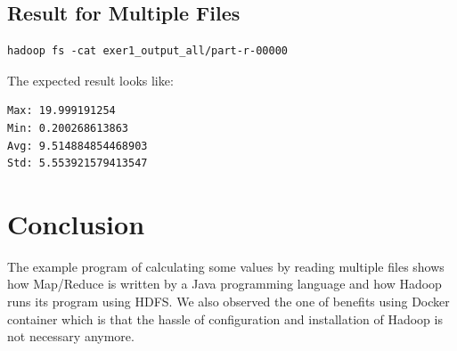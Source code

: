 \subsection{Result for Multiple Files}

\begin{lstlisting}
hadoop fs -cat exer1_output_all/part-r-00000
\end{lstlisting}

The expected result looks like:

\begin{lstlisting}
Max: 19.999191254
Min: 0.200268613863
Avg: 9.514884854468903
Std: 5.553921579413547
\end{lstlisting}

\section{Conclusion}

The example program of calculating some values by reading multiple
files shows how Map/Reduce is written by a Java programming language
and how Hadoop runs its program using HDFS. We also observed the one
of benefits using Docker container which is that the hassle of
configuration and installation of Hadoop is not necessary anymore.


